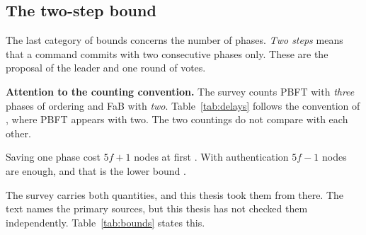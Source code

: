 \subsection{The two-step bound}

The last category of bounds concerns the number of phases. \emph{Two
steps} means that a command commits with two consecutive phases only.
These are the proposal of the leader and one round of votes.

\textbf{Attention to the counting convention.} The survey
\cite{amiri2024bedrock} counts PBFT with \emph{three} phases of ordering
and FaB with \emph{two}. Table~\ref{tab:delays} follows the convention
of \cite{malkhi2023hotstuff2}\prep, where PBFT appears with two. The two
countings do not compare with each other.

Saving one phase cost $5f{+}1$ nodes at first \cite{martin2006fab}\unver.
With authentication $5f{-}1$ nodes are enough, and that is the lower
bound \cite{kuznetsov2021optimal,abraham2021goodcase}\unver.

The survey \cite{amiri2024bedrock} carries both quantities, and this
thesis took them from there. The text names the primary sources, but
this thesis has not checked them independently.
Table~\ref{tab:bounds} states this.

